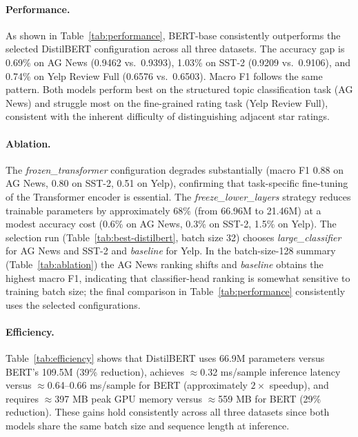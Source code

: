 \documentclass{article}
\begin{document}
\begin{table}[!b]
\centering
\caption{Selected best DistilBERT configuration per dataset. Selection used macro F1 as the primary criterion, with latency and trainable parameter count as tiebreakers. Metrics are from the ablation study (training batch size 32).}
\label{tab:best-distilbert}
\resizebox{\linewidth}{!}{}
\end{table}

\paragraph{Performance.}
As shown in Table~\ref{tab:performance}, BERT-base consistently outperforms the selected DistilBERT configuration across all three datasets. The accuracy gap is 0.69\% on AG News (0.9462 vs.\ 0.9393), 1.03\% on SST-2 (0.9209 vs.\ 0.9106), and 0.74\% on Yelp Review Full (0.6576 vs.\ 0.6503). Macro F1 follows the same pattern. Both models perform best on the structured topic classification task (AG News) and struggle most on the fine-grained rating task (Yelp Review Full), consistent with the inherent difficulty of distinguishing adjacent star ratings.

\paragraph{Ablation.}
The \emph{frozen\_transformer} configuration degrades substantially (macro F1 0.88 on AG News, 0.80 on SST-2, 0.51 on Yelp), confirming that task-specific fine-tuning of the Transformer encoder is essential. The \emph{freeze\_lower\_layers} strategy reduces trainable parameters by approximately 68\% (from 66.96M to 21.46M) at a modest accuracy cost (0.6\% on AG News, 0.3\% on SST-2, 1.5\% on Yelp). The selection run (Table~\ref{tab:best-distilbert}, batch size 32) chooses \emph{large\_classifier} for AG News and SST-2 and \emph{baseline} for Yelp. In the batch-size-128 summary (Table~\ref{tab:ablation}) the AG News ranking shifts and \emph{baseline} obtains the highest macro F1, indicating that classifier-head ranking is somewhat sensitive to training batch size; the final comparison in Table~\ref{tab:performance} consistently uses the selected configurations.

\paragraph{Efficiency.}
Table~\ref{tab:efficiency} shows that DistilBERT uses 66.9M parameters versus BERT's 109.5M (39\% reduction), achieves $\approx$0.32 ms/sample inference latency versus $\approx$0.64--0.66 ms/sample for BERT (approximately $2\times$ speedup), and requires $\approx$397 MB peak GPU memory versus $\approx$559 MB for BERT (29\% reduction). These gains hold consistently across all three datasets since both models share the same batch size and sequence length at inference.
\end{document}
